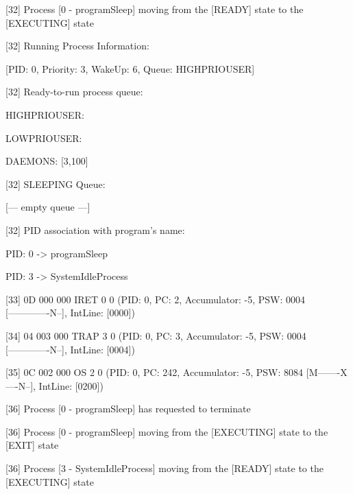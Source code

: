 	[\textcolor{termred}{32}] Process [\textcolor{termgreen}{0} - \textcolor{termgreen}{programSleep}] moving from the [\textcolor{termgreen}{READY}] state to the [\textcolor{termgreen}{EXECUTING}] state

	[\textcolor{termred}{32}] Running Process Information:

		[PID: \textcolor{termgreen}{0}, Priority: 3, WakeUp: \textcolor{termred}{6}, Queue: HIGHPRIOUSER]

	[\textcolor{termred}{32}] Ready-to-run process queue:

 		HIGHPRIOUSER: 

		LOWPRIOUSER: 

		DAEMONS: [\textcolor{termgreen}{3},100]

	[\textcolor{termred}{32}] SLEEPING Queue:

		[--- empty queue ---]

	[\textcolor{termred}{32}] PID association with program's name:

		PID: \textcolor{termgreen}{0} -> programSleep

		PID: \textcolor{termgreen}{3} -> SystemIdleProcess

[\textcolor{termred}{33}] {0D 000 000} IRET 0 0 (PID: \textcolor{termgreen}{0}, PC: \textcolor{termred}{2}, Accumulator: \textcolor{termred}{-5}, PSW: \textcolor{termred}{0004} [\textcolor{termred}{-------------N--}], IntLine: [\textcolor{termred}{0000}])

[34] {04 003 000} TRAP 3 0 (PID: \textcolor{termgreen}{0}, PC: \textcolor{termred}{3}, Accumulator: \textcolor{termred}{-5}, PSW: \textcolor{termred}{0004} [\textcolor{termred}{-------------N--}], IntLine: [\textcolor{termred}{0004}])

[\textcolor{termred}{35}] {0C 002 000} OS 2 0 (PID: \textcolor{termgreen}{0}, PC: \textcolor{termred}{242}, Accumulator: \textcolor{termred}{-5}, PSW: \textcolor{termred}{8084} [\textcolor{termred}{M-------X----N--}], IntLine: [\textcolor{termred}{0200}])

	[\textcolor{termred}{36}] \textcolor{termred}{Process [0 - programSleep] has requested to terminate}

	[\textcolor{termred}{36}] Process [\textcolor{termgreen}{0} - \textcolor{termgreen}{programSleep}] moving from the [\textcolor{termgreen}{EXECUTING}] state to the [\textcolor{termgreen}{EXIT}] state

	[\textcolor{termred}{36}] Process [\textcolor{termgreen}{3} - \textcolor{termgreen}{SystemIdleProcess}] moving from the [\textcolor{termgreen}{READY}] state to the [\textcolor{termgreen}{EXECUTING}] state

